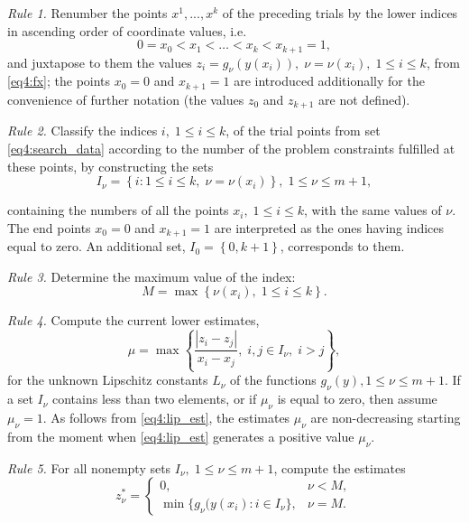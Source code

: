 \emph{Rule 1.} Renumber the points $x^1,...,x^k$ of the preceding trials by the lower indices in ascending order of coordinate values, i.e.
\begin{equation}
  \label{eq4:search_data}
  0=x_0<x_1<\dots <x_k<x_{k+1}=1,
\end{equation}
and juxtapose to them the values $z_i=g_\nu(y(x_i)), \; \nu=\nu(x_i), \; 1
\leq i \leq k$, from \eqref{eq4:fx}; the points $x_0=0$ and
$x_{k+1}=1$ are introduced additionally for the convenience  of further notation (the values $z_0$ and $z_{k+1}$ are not defined).

\emph{Rule 2.} Classify the indices $i, \; 1 \leq i \leq k$, of the trial points from set \eqref{eq4:search_data} according to the number of the problem constraints fulfilled at these points, by constructing the sets
\begin{equation}
  I_\nu =\left\{i:1 \leq i \leq k, \; \nu=\nu(x_i) \right\}, \; 1 \leq \nu \leq m+1,
\end{equation}

containing the numbers of all the points $x_i, \; 1 \leq i \leq k$, with
the same values of $\nu$. The end points $x_0=0$ and $x_{k+1}=1$ are
interpreted as the ones having indices equal to zero. An additional set,
$I_0=\left\{0,k+1\right\}$, corresponds to them.

\emph{Rule 3.} Determine the maximum value of the index:
\begin{equation}
  M=\max\left\{\nu(x_i), \; 1 \leq i \leq k \right \}.
\end{equation}

\emph{Rule 4.} Compute the current lower estimates,
\begin{equation}
  \label{eq4:lip_est}
  \mu = \max\left\{ \frac{\left|z_i-z_j\right|}{ x_i - x_j }, \; i,j \in I_\nu, \; i>j \right\},
\end{equation}
for the unknown Lipschitz constants $L_\nu$ of the functions $g_\nu(y),1
\leq \nu \leq m+1$. If a set $I_\nu$ contains less than two elements, or
if $\mu_\nu$ is equal to zero, then assume $\mu_\nu=1$. As follows from \eqref{eq4:lip_est}, the estimates $\mu_\nu$ are non-decreasing starting from the moment when \eqref{eq4:lip_est} generates a positive value $\mu_\nu$.

\emph{Rule 5.} For all nonempty sets $I_\nu, \; 1 \leq \nu \leq m+1$, compute the estimates
\begin{equation}
  \label{eq4:z_const}
  z_\nu^\ast = \left\{
  \begin{array}{lr}
    0, & \nu < M,\\
    \min\{ g_\nu(y(x_i): i\in I_\nu \}, & \nu = M.
  \end{array}
  \right.
\end{equation}


